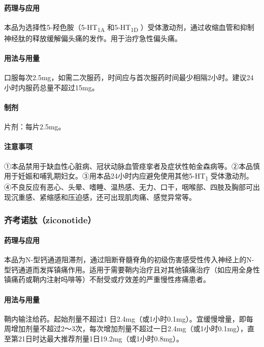 \paragraph{药理与应用}

本品为选择性5-羟色胺（5-HT\textsubscript{1A} 和5-HT\textsubscript{1D}
）受体激动剂，通过收缩血管和抑制神经肽的释放缓解偏头痛的发作。用于治疗急性偏头痛。

\paragraph{用法与用量}

口服每次2.5mg，如需二次服药，时间应与首次服药时间最少相隔2小时。建议24小时内服药总量不超过15mg。

\paragraph{制剂}

片剂：每片2.5mg。

\paragraph{注意事项}

①本品禁用于缺血性心脏病、冠状动脉血管痉挛者及症状性帕金森病等。②本品慎用于妊娠和哺乳期妇女。③用本品24小时内应避免使用其他5-HT\textsubscript{1}
受体激动剂。④不良反应有恶心、头晕、嗜睡、温热感、无力、口干，咽喉部、四肢及胸部可出现沉重感、紧缩感和压迫感，还可出现肌肉痛、感觉异常等。

\subsubsection{齐考诺肽（ziconotide）}

\paragraph{药理与应用}

本品为N-型钙通道阻滞剂，通过阻断脊髓脊角的初级伤害感受性传入神经上的N-型钙通道而发挥镇痛作用。适用于需要鞘内治疗且对其他镇痛治疗（如应用全身性镇痛药或鞘内注射吗啡等）不耐受或疗效差的严重慢性疼痛患者。

\paragraph{用法与用量}

鞘内输注给药。起始剂量不超过1
日2.4mg（或1小时0.1mg）。宜缓慢增量，即每周增加剂量不超过2～3次，每次增加剂量不超过一日2.4mg（或1小时0.1mg），直至第21日时达最大推荐剂量1日19.2mg（或1小时0.8mg）。

